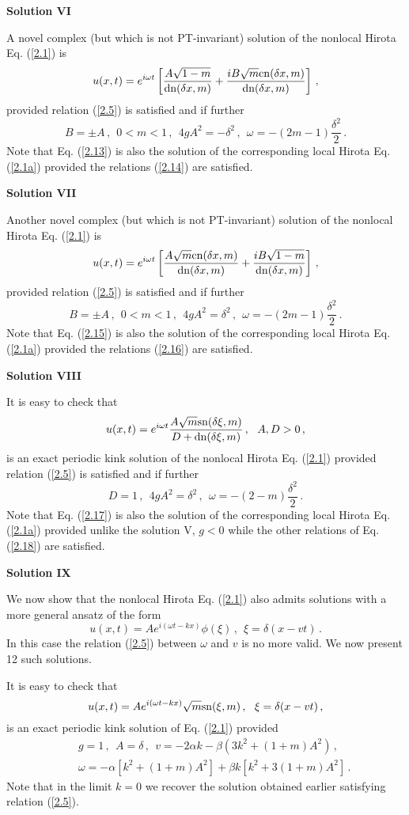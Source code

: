 \documentclass[11pt]{article}
\newcommand{\be}{\begin{equation}}
\newcommand{\ee}{\end{equation}}
\newcommand{\bea}{\begin{eqnarray}}
\newcommand{\eea}{\end{eqnarray}}
\newcommand{\sn}{{\rm sn}}
\newcommand{\dn}{{\rm dn}}
\newcommand{\cn}{{\rm cn}}
\begin{document}
{\bf Solution VI}

A novel complex (but which is not PT-invariant) solution of the nonlocal
Hirota Eq. (\ref{2.1}) is 
\be\label{2.13}
u(x,t) = e^{i\omega t} \left[\frac{A\sqrt{1-m}}{\dn(\delta x,m)} 
+\frac{iB\sqrt{m}\cn(\delta x,m)}{\dn(\delta x,m)}\right]\,,
\ee
provided relation (\ref{2.5}) is satisfied and if further
\be\label{2.14}
B = \pm A\,,~~0 < m < 1\,,~~4g A^2 = -\delta^2\,,~~\omega 
= -(2m-1)\frac{\delta^2}{2}\,.
\ee
Note that Eq. (\ref{2.13}) is also the solution of the 
corresponding local Hirota Eq. (\ref{2.1a}) provided the relations
(\ref{2.14}) are satisfied.

{\bf Solution VII}

Another novel complex (but which is not PT-invariant) solution of the 
nonlocal Hirota Eq. (\ref{2.1}) is
\be\label{2.15}
u(x,t) = e^{i\omega t} \left[\frac{A\sqrt{m}\cn(\delta x,m)}{\dn(\delta x,m)} 
+\frac{iB\sqrt{1-m}}{\dn(\delta x,m)}\right]\,,
\ee
provided relation (\ref{2.5}) is satisfied and if further 
\be\label{2.16}
B = \pm A\,,~~0 < m < 1\,,~~4g A^2 = \delta^2\,,~~\omega
= -(2m-1)\frac{\delta^2}{2}\,.
\ee
Note that Eq. (\ref{2.15}) is also the solution of the 
corresponding local Hirota Eq. (\ref{2.1a}) provided the relations
(\ref{2.16}) are satisfied.

{\bf Solution VIII}

It is easy to check that 
\be\label{2.17}
u(x,t) = e^{i\omega t} \frac{A\sqrt{m}\sn(\delta \xi,m)}
{D+\dn(\delta \xi,m)}\,,~~A,D > 0\,,
\ee
is an exact periodic kink solution of the nonlocal Hirota Eq. (\ref{2.1}) 
provided relation (\ref{2.5}) is satisfied and if further
\be\label{2.18}
D = 1\,,~~4 g A^2 = \delta^2\,,~~\omega = -(2-m)\frac{\delta^2}{2}\,.
\ee
Note that Eq. (\ref{2.17}) is also the solution of the 
corresponding local Hirota Eq. (\ref{2.1a}) provided unlike the solution V,
$g < 0$ while the other relations of Eq. (\ref{2.18}) are satisfied.

{\bf Solution IX}

We now show that the nonlocal Hirota Eq. (\ref{2.1}) also admits solutions
with a more general ansatz of the form
\be\label{8.1}
u(x,t) = A e^{i(\omega t - kx)} \phi(\xi)\,,~~\xi = \delta(x-vt)\,.
\ee
In this case the relation (\ref{2.5}) between $\omega$ and $v$ is no 
more valid. We now present 12 such solutions. 

It is easy to check that 
\be\label{8.2}
u(x,t) = A e^{i(\omega t - kx)} \sqrt{m} \sn(\xi,m)\,,~~\xi = \delta(x-vt)\,,
\ee
is an exact periodic kink solution of Eq. (\ref{2.1}) provided
\bea\label{8.3}
&&g = 1\,,~~A = \delta\,,~~v = -2\alpha k -\beta(3k^2+(1+m)A^2)\,,
\nonumber \\
&&\omega = -\alpha[k^2+(1+m)A^2] +\beta k [k^2+3(1+m)A^2]\,.
\eea
Note that in the limit $k = 0$ we recover the solution obtained 
earlier \cite{ks2} satisfying relation (\ref{2.5}). 
\end{document}
